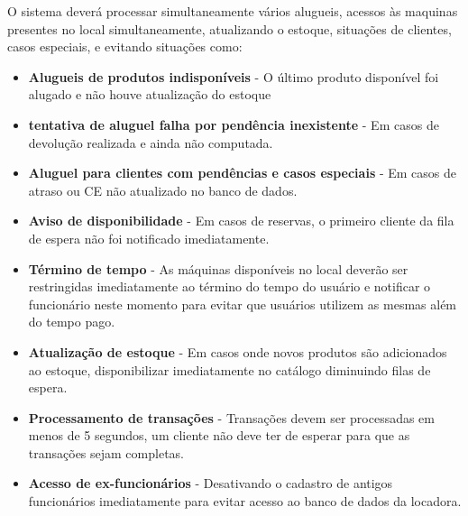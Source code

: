 \documentclass{article}
\begin{document}
    O sistema deverá processar simultaneamente vários alugueis, acessos às maquinas presentes no local simultaneamente, atualizando o estoque, situações de clientes, casos especiais, e  evitando situações como:
      \begin{itemize}
        \item \textbf{Alugueis de produtos indisponíveis} - O último produto disponível foi alugado e não houve atualização do estoque
        \item \textbf{tentativa de aluguel falha por pendência inexistente} -  Em casos de devolução realizada e ainda não computada.
        \item \textbf{Aluguel para clientes com pendências e casos especiais} - Em casos de atraso ou CE não atualizado no banco de dados.
        \item \textbf{Aviso de disponibilidade} - Em casos de reservas, o primeiro cliente da fila de espera não foi notificado imediatamente.
        \item \textbf{Término de tempo} - As máquinas disponíveis no local deverão ser restringidas imediatamente ao término do tempo do usuário e notificar o funcionário neste momento para evitar que usuários utilizem as mesmas além do tempo pago.
        \item \textbf{Atualização de estoque} - Em casos onde novos produtos são adicionados ao estoque, disponibilizar imediatamente no catálogo diminuindo filas de espera.
        \item \textbf{Processamento de transações} - Transações devem ser processadas em menos de 5 segundos, um cliente não deve ter de esperar para que as transações sejam completas.
        \item \textbf{Acesso de ex-funcionários} - Desativando o cadastro de antigos funcionários imediatamente para evitar acesso ao banco de dados da locadora.
  \end{itemize}
        
\end{document}
